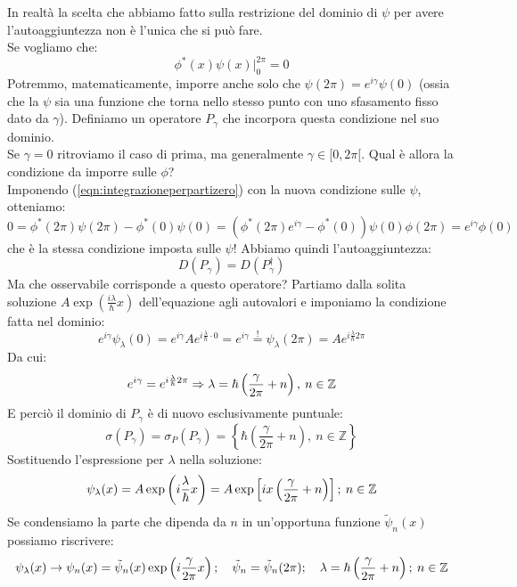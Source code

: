 \documentclass[../../FisicaTeorica.tex]{subfiles}
\begin{document}
In realtà la scelta che abbiamo fatto sulla restrizione del dominio di $\psi$ per avere l'autoaggiuntezza non è l'unica che si può fare.\\
Se vogliamo che:
\begin{equation}
\phi^\ast\left(x\right)\psi \left(x\right)\big|_0^{2\pi}=0
\label{eqn:integrazioneperpartizero}
\end{equation}
Potremmo, matematicamente, imporre anche solo che $\psi \left(2\pi\right)=e^{i\gamma}\psi \left(0\right)$ (ossia che la $\psi$ sia una funzione  che torna nello stesso punto con uno sfasamento fisso dato da $\gamma$). Definiamo un operatore $P_\gamma$ che incorpora questa condizione nel suo dominio.\\
Se $\gamma =0$ ritroviamo il caso di prima, ma generalmente $\gamma \in [0, 2\pi [$. Qual è allora la condizione da imporre sulle $\phi$?\\
Imponendo (\ref{eqn:integrazioneperpartizero}) con la nuova condizione sulle $\psi$, otteniamo:
\[
0= \phi^\ast\left(2\pi\right)\psi\left(2\pi\right)- \phi^\ast\left(0\right)\psi \left(0\right)=\left(\phi^\ast\left(2\pi\right)e^{i\gamma}-\phi^\ast\left(0\right)\right)\psi\left(0\right)\phi\left(2\pi\right)=e^{i\gamma}\phi \left(0\right)
\]
che è la stessa condizione imposta sulle $\psi$! Abbiamo quindi l'autoaggiuntezza:
\[
D\left(P_\gamma\right)=D\left(P_\gamma^\dag\right)
\]
Ma che osservabile corrisponde a questo operatore? Partiamo dalla solita soluzione $A\exp\left(\frac{i\lambda}{\hbar}x\right)$ dell'equazione agli autovalori e imponiamo la condizione fatta nel dominio:
\[
e^{i\gamma}\psi_\lambda\left(0\right)=e^{i\gamma}A e^{i\frac{\lambda}{\hbar}\cdot 0}=e^{i\gamma}\overset{!}{=}\psi_\lambda\left(2\pi\right)=A e^{i\frac{\lambda}{\hbar}2\pi}
\]
Da cui: 
\[
e^{i\gamma}=e^{i\frac{\lambda}{\hbar}2\pi}\Rightarrow \lambda = \hbar \left(\frac{\gamma}{2\pi} + n\right), \> n\in \mathbb{Z}
\]
E perciò il dominio di $P_\gamma$ è di nuovo esclusivamente puntuale:
\[
\sigma\left(P_\gamma\right)= \sigma_P\left(P_\gamma\right)= \left\{\hbar\left(\frac{\gamma}{2\pi}+n\right),\ n\in\mathbb{Z}\right\}
\]
Sostituendo l'espressione per $\lambda$ nella soluzione:
\[
\psi_\lambda(x) = A \exp\left(i\frac{\lambda}{\hbar}x\right) = A \exp\left [ix\left(\frac{\gamma}{2\pi}+n\right)\right ]; \> n\in\mathbb{Z}
\]
Se condensiamo la parte che dipenda da $n$ in un'opportuna funzione $\tilde{\psi}_n(x)$ possiamo riscrivere:
\[
\psi_\lambda(x) \rightarrow \psi_n(x) = \tilde{\psi}_n(x) \exp\left(i\frac{\gamma}{2\pi}x\right); \quad \tilde{\psi}_n = \tilde{\psi}_n(2\pi); \quad \lambda = \hbar \left(\frac{\gamma}{2\pi} + n\right); \> n\in \mathbb{Z}
\]
\end{document}
